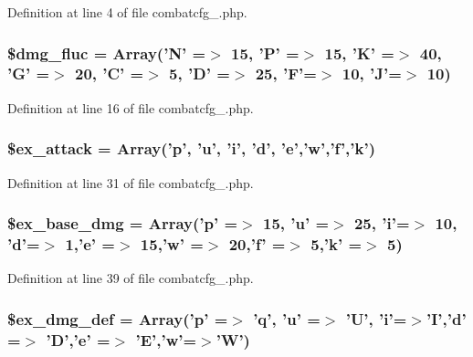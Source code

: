 Definition at line 4 of file combatcfg\+\_.\+php.

\hypertarget{combatcfg__1_8php_ac91da8ed2c61fc98debd39a8dcf2614f}{
\subsubsection[{\$dmg\+\_\+fluc}]{\setlength{\rightskip}{0pt plus 5cm}\$dmg\+\_\+fluc = Array('N' =$>$ 15, 'P' =$>$ 15, 'K' =$>$ 40, 'G' =$>$ 20, 'C' =$>$ 5, 'D' =$>$ 25, 'F'=$>$ 10, 'J'=$>$ 10)}}\label{combatcfg__1_8php_ac91da8ed2c61fc98debd39a8dcf2614f}


Definition at line 16 of file combatcfg\+\_.\+php.

\hypertarget{combatcfg__1_8php_af4c5e217c5117d40171c0f2862aa9875}{
\subsubsection[{\$ex\+\_\+attack}]{\setlength{\rightskip}{0pt plus 5cm}\$ex\+\_\+attack = Array('p', 'u', 'i', 'd', 'e','w','f','k')}}\label{combatcfg__1_8php_af4c5e217c5117d40171c0f2862aa9875}


Definition at line 31 of file combatcfg\+\_.\+php.

\hypertarget{combatcfg__1_8php_acb8bfd04ad1a4a5af67fd08bac980a78}{
\subsubsection[{\$ex\+\_\+base\+\_\+dmg}]{\setlength{\rightskip}{0pt plus 5cm}\$ex\+\_\+base\+\_\+dmg = Array('p' =$>$ 15, 'u' =$>$ 25, 'i'=$>$ 10, 'd'=$>$ 1,'e' =$>$ 15,'w' =$>$ 20,'f' =$>$ 5,'k' =$>$ 5)}}\label{combatcfg__1_8php_acb8bfd04ad1a4a5af67fd08bac980a78}


Definition at line 39 of file combatcfg\+\_.\+php.

\hypertarget{combatcfg__1_8php_ada41d88a06bdb3e9fe7ad54d02b14d7c}{
\subsubsection[{\$ex\+\_\+dmg\+\_\+def}]{\setlength{\rightskip}{0pt plus 5cm}\$ex\+\_\+dmg\+\_\+def = Array('p' =$>$ 'q', 'u' =$>$ 'U', 'i'=$>$'I','d' =$>$ 'D','e' =$>$ 'E','w'=$>$'W')}}\label{combatcfg__1_8php_ada41d88a06bdb3e9fe7ad54d02b14d7c}


